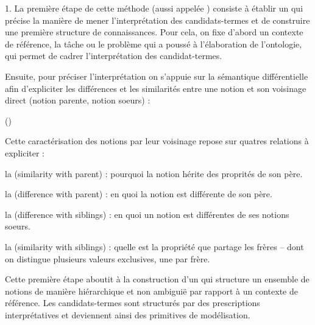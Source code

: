 \begin{liste}
	\item[1.] La première étape de cette méthode (aussi appelée ) consiste à établir un   qui précise la manière de mener l'interprétation des candidats-termes et de construire une première structure de connaissances. 
	Pour cela, on fixe d'abord un contexte de référence, la tâche ou le problème qui a poussé à l'élaboration de l'ontologie, qui permet de cadrer l'interprétation des candidat-termes.

	Ensuite, pour préciser l'interprétation on s'appuie sur la sémantique différentielle afin d'expliciter les différences et les similarités entre une notion et son voisinage direct (notion parente, notion soeurs) : 

	 (\cite[p.139]{bachimont:icc})

	Cette caractérisation des notions par leur voisinage repose sur quatres relations à expliciter : 
	\begin{liste}
		\item la  (similarity with parent) : pourquoi la notion hérite des proprités de son père.
		\item la  (difference with parent) : en quoi la notion est différente de son père.
		\item la  (difference with siblings) : en quoi un notion est différentes de ses notions soeurs.
		\item la  (similarity with siblings) : quelle est la propriété que partage les frères -- dont on distingue plusieurs valeurs exclusives, une par frère.\\ 		
	\end{liste}
\end{liste}

	Cette première étape aboutit à la construction d'un  qui structure un ensemble de notions de manière hiérarchique et non ambiguië par rapport à un contexte de référence.
	Les candidats-termes sont structurés par des prescriptions interprétatives et deviennent ainsi des primitives de modélisation.\\

